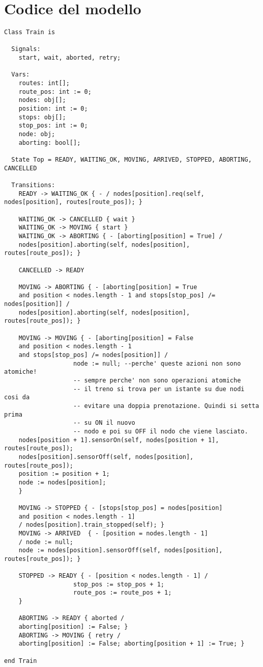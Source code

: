 \chapter{Codice del modello}
\label{cap:code}
\begin{lstlisting}[caption={modello della classe Train}]
Class Train is

  Signals:
    start, wait, aborted, retry;

  Vars:
    routes: int[];
    route_pos: int := 0;
    nodes: obj[];
    position: int := 0;
    stops: obj[];
    stop_pos: int := 0;
    node: obj;
    aborting: bool[];

  State Top = READY, WAITING_OK, MOVING, ARRIVED, STOPPED, ABORTING, CANCELLED

  Transitions:
    READY -> WAITING_OK { - / nodes[position].req(self, nodes[position], routes[route_pos]); }

    WAITING_OK -> CANCELLED { wait }  
    WAITING_OK -> MOVING { start }
    WAITING_OK -> ABORTING { - [aborting[position] = True] / 
    nodes[position].aborting(self, nodes[position], routes[route_pos]); }
    
    CANCELLED -> READY

    MOVING -> ABORTING { - [aborting[position] = True 
    and position < nodes.length - 1 and stops[stop_pos] /= nodes[position]] / 
    nodes[position].aborting(self, nodes[position], routes[route_pos]); }
    
    MOVING -> MOVING { - [aborting[position] = False 
    and position < nodes.length - 1 
    and stops[stop_pos] /= nodes[position]] /                    
                   node := null; --perche' queste azioni non sono atomiche!
                   -- sempre perche' non sono operazioni atomiche
                   -- il treno si trova per un istante su due nodi cosi da
                   -- evitare una doppia prenotazione. Quindi si setta prima 
                   -- su ON il nuovo
                   -- nodo e poi su OFF il nodo che viene lasciato.
    nodes[position + 1].sensorOn(self, nodes[position + 1], routes[route_pos]);
    nodes[position].sensorOff(self, nodes[position], routes[route_pos]);
    position := position + 1;
    node := nodes[position];
    }

    MOVING -> STOPPED { - [stops[stop_pos] = nodes[position] 
    and position < nodes.length - 1] 
    / nodes[position].train_stopped(self); }
    MOVING -> ARRIVED  { - [position = nodes.length - 1] 
    / node := null; 
    node := nodes[position].sensorOff(self, nodes[position], routes[route_pos]); }
    
    STOPPED -> READY { - [position < nodes.length - 1] /
                   stop_pos := stop_pos + 1;
                   route_pos := route_pos + 1;
    }
    
    ABORTING -> READY { aborted / 
    aborting[position] := False; }
    ABORTING -> MOVING { retry / 
    aborting[position] := False; aborting[position + 1] := True; }

end Train
\end{lstlisting}
